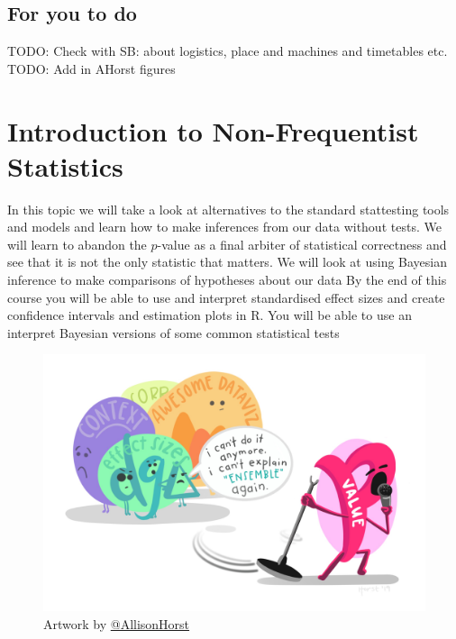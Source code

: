 \documentclass[
]{book}
\begin{document}
\hypertarget{for-you-to-do-2}{%
\section{For you to do}\label{for-you-to-do-2}}

TODO: Check with SB: about logistics, place and machines and timetables etc.
TODO: Add in AHorst figures

\hypertarget{introduction-to-non-frequentist-statistics}{%
\chapter{Introduction to Non-Frequentist Statistics}\label{introduction-to-non-frequentist-statistics}}

In this topic we will take a look at alternatives to the standard stattesting tools and models and learn how to make inferences from our data without tests. We will learn to abandon the \(p\)-value as a final arbiter of statistical correctness and see that it is not the only statistic that matters. We will look at using Bayesian inference to make comparisons of hypotheses about our data By the end of this course you will be able to use and interpret standardised effect sizes and create confidence intervals and estimation plots in R. You will be able to use an interpret Bayesian versions of some common statistical tests

\begin{figure}
\centering
\includegraphics{p_value_mic_hog.jpg}
\caption{\label{fig:unnamed-chunk-5}Artwork by \href{https://github.com/allisonhorst}{@AllisonHorst}}
\end{figure}
\end{document}
